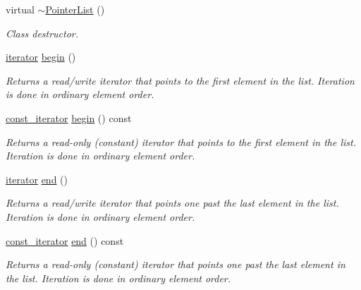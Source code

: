 \begin{DoxyCompactItemize}
\mbox{\label{classutils_1_1PointerList_af79ecd29ef44bad30173a274fd550503}} 
virtual \hyperlink{classutils_1_1PointerList_af79ecd29ef44bad30173a274fd550503}{$\sim$\+Pointer\+List} ()
\begin{DoxyCompactList}\small\item\em Class destructor. \end{DoxyCompactList}\item 
\mbox{\label{classutils_1_1PointerList_a501664b90309db885554d35e89739681}} 
\hyperlink{classutils_1_1PointerList_a05f57884241fe77050d177e9615501e3}{iterator} \hyperlink{classutils_1_1PointerList_a501664b90309db885554d35e89739681}{begin} ()
\begin{DoxyCompactList}\small\item\em Returns a read/write iterator that points to the first element in the list. Iteration is done in ordinary element order. \end{DoxyCompactList}\item 
\mbox{\label{classutils_1_1PointerList_a53f26a5a311890982c8c278e1f37a313}} 
\hyperlink{classutils_1_1PointerList_aec91f3c1085620fe3beaff9ecee67293}{const\+\_\+iterator} \hyperlink{classutils_1_1PointerList_a53f26a5a311890982c8c278e1f37a313}{begin} () const
\begin{DoxyCompactList}\small\item\em Returns a read-\/only (constant) iterator that points to the first element in the list. Iteration is done in ordinary element order. \end{DoxyCompactList}\item 
\mbox{\label{classutils_1_1PointerList_a9607cdd93b715a838e015452a49f61d5}} 
\hyperlink{classutils_1_1PointerList_a05f57884241fe77050d177e9615501e3}{iterator} \hyperlink{classutils_1_1PointerList_a9607cdd93b715a838e015452a49f61d5}{end} ()
\begin{DoxyCompactList}\small\item\em Returns a read/write iterator that points one past the last element in the list. Iteration is done in ordinary element order. \end{DoxyCompactList}\item 
\mbox{\label{classutils_1_1PointerList_adb6a2b31b3e7d556e3d49c2690a93dc7}} 
\hyperlink{classutils_1_1PointerList_aec91f3c1085620fe3beaff9ecee67293}{const\+\_\+iterator} \hyperlink{classutils_1_1PointerList_adb6a2b31b3e7d556e3d49c2690a93dc7}{end} () const
\begin{DoxyCompactList}\small\item\em Returns a read-\/only (constant) iterator that points one past the last element in the list. Iteration is done in ordinary element order. \end{DoxyCompactList}\end{DoxyCompactItemize}


